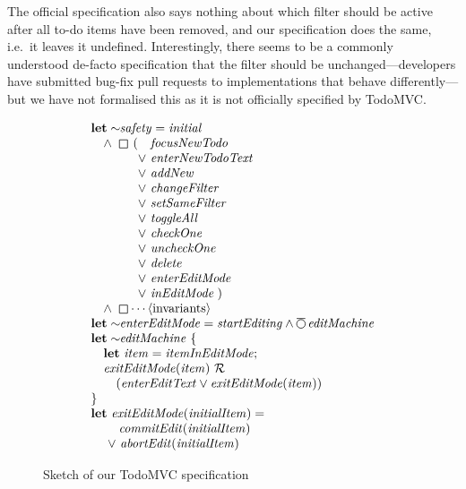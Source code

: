 \documentclass[sigplan,nonacm,10pt]{acmart}
\newcommand{\WNext}{\operatorname{%
  \tikz[baseline]{
    \draw[line width=.12ex]
      (0,.6ex) circle (.8ex);
      \draw[line width=.12ex] (-0.8ex,1.6ex) -- (0.8ex,1.6ex);
  }}}{}
\newcommand{\Always}{\operatorname{%
  \tikz[baseline]{
    \draw[draw=white] (-0.2ex,0ex) -- (1.7ex,0ex);
    \draw[line width=.12ex,line join=round]
      (0ex,-.2ex) -- (0ex,1.3ex) -- (1.5ex,1.3ex) -- (1.5ex,.-.2ex) -- cycle;
  }}}{}
\newcommand{\Release}{\mathbin{%
  \mathcal{R}}}{}
\begin{document}
    The official specification also says nothing about which filter should be
    active after all to-do items have been removed, and
    our specification does the same, i.e.\ it leaves it undefined. Interestingly, there
    seems to be a commonly understood de-facto specification that the filter should be unchanged---developers
    have submitted bug-fix pull requests to implementations that behave differently---but we have not
    formalised this as it is not officially specified by TodoMVC.
\begin{figure}
  $$
\begin{array}{l}
  \textbf{let} \sim\!\!\mathit{safety} = \mathit{initial} \\
  \quad\!\!\!\begin{array}{rl} \land\ \Always\ (\ \ & \!\!\!\!\mathit{focusNewTodo} \\
    \lor & \!\!\!\!\mathit{enterNewTodoText} \\
    \lor & \!\!\!\!\mathit{addNew} \\
    \lor & \!\!\!\!\mathit{changeFilter} \\
    \lor & \!\!\!\!\mathit{setSameFilter} \\
    \lor & \!\!\!\!\mathit{toggleAll} \\
    \lor & \!\!\!\!\mathit{checkOne} \\
    \lor & \!\!\!\!\mathit{uncheckOne} \\
    \lor & \!\!\!\!\mathit{delete} \\
    \lor & \!\!\!\!\mathit{enterEditMode} \\
    \lor & \!\!\!\!\mathit{inEditMode} \;
    )\ %
  \end{array}\\
  \quad\land\ \Always \cdots \langle \text{invariants} \rangle \\
  \textbf{let} \sim\!\!\mathit{enterEditMode} = \mathit{startEditing} \land \WNext \mathit{editMachine} \\
  \textbf{let} \sim\!\!\mathit{editMachine}\ \{ \\
    \quad \textbf{let}\ \mathit{item} = \mathit{itemInEditMode};\\
  \quad \mathit{exitEditMode}(\mathit{item})\ \Release\\\qquad ( \mathit{enterEditText} \lor \mathit{exitEditMode}(\mathit{item}) )\\
  \}\\
  \textbf{let}\ \mathit{exitEditMode}(\mathit{initialItem}) =\\
  \qquad\;\;\! \!  \mathit{commitEdit}(\mathit{initialItem})\\
  \quad\  \lor\ \mathit{abortEdit}(\mathit{initialItem})
\end{array}
$$
  \caption{Sketch of our TodoMVC specification}
  \label{fig:todomvcspec}
\end{figure}
\end{document}
